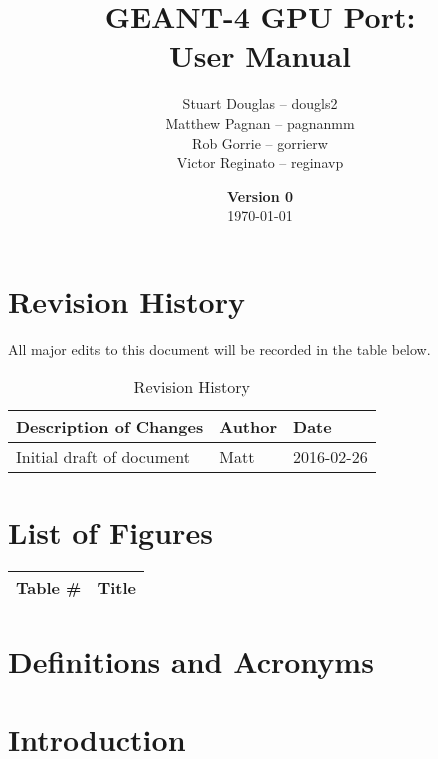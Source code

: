 \documentclass[12pt]{article}
\title{
\LARGE GEANT-4 GPU Port:
\\\vspace{10mm}
\large \textbf{User Manual}
\vspace{40mm}
}
\author{
Stuart Douglas -- dougls2
\\Matthew Pagnan -- pagnanmm
\\Rob Gorrie -- gorrierw
\\Victor Reginato -- reginavp
\vspace{10mm}
}
\date{\vfill \textbf{Version 0}\\ \today}
\begin{document}

\maketitle
\newpage

\tableofcontents
\newpage
{}
\restoregeometry

\section{Revision History}
All major edits to this document will be recorded in the table below.

\begin{table}[h]
\centering
\caption{Revision History}\label{Table_Revision}
\begin{tabular}{lll}
\toprule
\bf Description of Changes & \bf Author & \bf Date\\\midrule
Initial draft of document & Matt & 2016-02-26\\
\bottomrule
\end{tabular}
\end{table}

\section{List of Figures}
\begin{center}
\begin{tabular}{cl}
\toprule
\bf Table \# & \bf Title\\\midrule
\bottomrule
\end{tabular}
\end{center}

\section{Definitions and Acronyms} %

\section{Introduction} %
\end{document}
